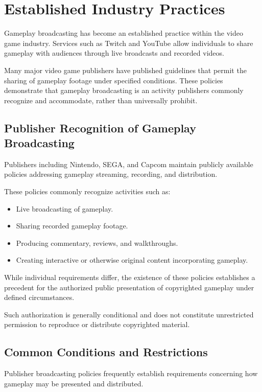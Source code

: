 \section{Established Industry Practices}

Gameplay broadcasting has become an established practice
within the video game industry. Services such as Twitch
and YouTube allow individuals to share gameplay with
audiences through live broadcasts and recorded videos.

Many major video game publishers have published guidelines
that permit the sharing of gameplay footage under
specified conditions. These policies demonstrate that
gameplay broadcasting is an activity publishers commonly
recognize and accommodate, rather than universally prohibit.

\subsection{Publisher Recognition of Gameplay Broadcasting}

Publishers including Nintendo, SEGA, and Capcom maintain
publicly available policies addressing gameplay streaming,
recording, and distribution.

These policies commonly recognize activities such as:
\begin{itemize}
    \item Live broadcasting of gameplay.
    \item Sharing recorded gameplay footage.
    \item Producing commentary, reviews, and walkthroughs.
    \item Creating interactive or otherwise original
          content incorporating gameplay.
\end{itemize}

While individual requirements differ, the existence
of these policies establishes a precedent for the
authorized public presentation of copyrighted
gameplay under defined circumstances.

Such authorization is generally conditional and
does not constitute unrestricted permission to
reproduce or distribute copyrighted material.

\subsection{Common Conditions and Restrictions}

Publisher broadcasting policies frequently establish
requirements concerning how gameplay may be presented
and distributed.

